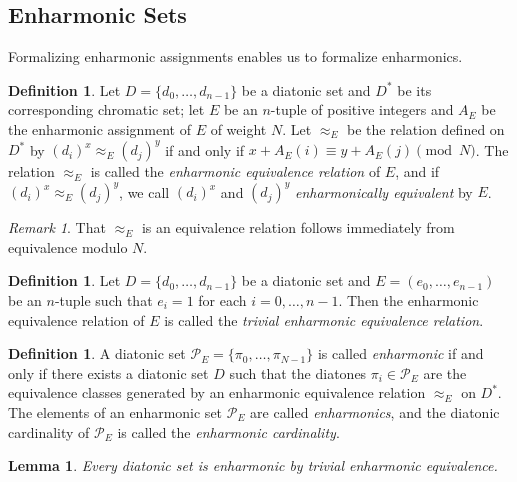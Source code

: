 \documentclass{article}
\theoremstyle{plain}
\newtheorem{lemma}[theorem]{Lemma}
\theoremstyle{definition}
\newtheorem{definition}[theorem]{Definition}
\theoremstyle{remark}
\newtheorem{remark}[theorem]{Remark}
\begin{document}
\subsection{Enharmonic Sets}
\label{SSEC.Enharmonics and Enharmonic Spaces}

Formalizing enharmonic assignments enables us to formalize enharmonics.

\begin{definition}
	Let $D=\{d_0,\dots,d_{n-1}\}$ be a diatonic set and $D^\ast$ be its corresponding chromatic set; let $E$ be an $n$-tuple of positive integers and $A_E$ be the enharmonic assignment of $E$ of weight $N$. Let $\approx_E$ be the relation defined on $D^\ast$ by $(d_i)^x\approx_E(d_j)^y$ if and only if $x+A_E(i)\equiv y+A_E(j)\pmod{N}$. The relation $\approx_E$ is called the \textit{enharmonic equivalence relation} of $E$, and if $(d_i)^x\approx_E(d_j)^y$, we call $(d_i)^x$ and $(d_j)^y$ \textit{enharmonically equivalent} by $E$.
\end{definition}

\begin{remark}
	That $\approx_E$ is an equivalence relation follows immediately from equivalence modulo $N$.
\end{remark}

\begin{definition}
\label{DEF.Trivial Enharmonic Equivalence Relation}
	Let $D=\{d_0,\dots,d_{n-1}\}$ be a diatonic set and $E=(e_0,\dots,e_{n-1})$ be an $n$-tuple such that $e_i=1$ for each $i=0,\dots,n-1$. Then the enharmonic equivalence relation of $E$ is called the \textit{trivial enharmonic equivalence relation}.
\end{definition}

\begin{definition}
\label{DEF.Enharmonic Set}
	A diatonic set $\mathcal{P}_E=\{\pi_0,\dots,\pi_{N-1}\}$ is called \textit{enharmonic} if and only if there exists a diatonic set $D$ such that the diatones $\pi_i\in\mathcal{P}_E$ are the equivalence classes generated by an enharmonic equivalence relation $\approx_E$ on $D^\ast$. The elements of an enharmonic set $\mathcal{P}_E$ are called \textit{enharmonics}, and the diatonic cardinality of $\mathcal{P}_E$ is called the \textit{enharmonic cardinality}.
\end{definition}

\begin{lemma}
\label{LEM.Diatonic Sets are Trivially Enharmonic}
	Every diatonic set is enharmonic by trivial enharmonic equivalence.
\end{lemma}
\end{document}
